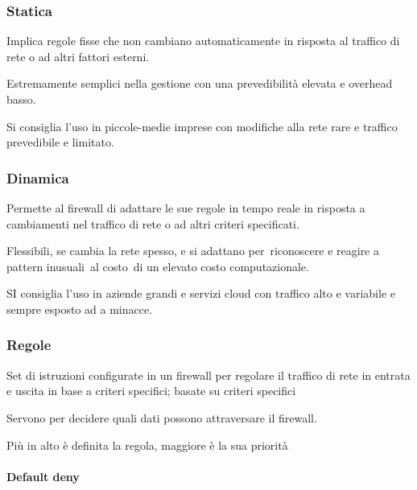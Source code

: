 \documentclass[
]{article}
\begin{document}
\subsubsection{\texorpdfstring{{Statica}}{Statica}}\label{h.iswr8y91qd0b}

{Implica regole fisse che non cambiano automaticamente in risposta al
traffico di rete o ad altri fattori esterni. }

{}

{Estremamente }{semplici nella gestione }{con una }{prevedibilità
elevata }{e }{overhead basso}{.}

{}

{Si consiglia l'uso in piccole-medie imprese con modifiche alla rete
rare e traffico prevedibile e limitato.}

\subsubsection{\texorpdfstring{{Dinamica}}{Dinamica}}\label{h.td2hx8kmr20g}

{Permette al firewall di adattare le sue regole in tempo reale in
risposta a cambiamenti nel traffico di rete o ad altri criteri
specificati.}

{}

{Flessibili}{, se cambia la rete spesso, e }{si adattano
per}{~riconoscere e reagire a }{pattern inusuali}{~al }{costo}{~di un
}{elevato }{costo computazionale.}

{}

{SI consiglia l'uso in aziende grandi e servizi cloud con traffico alto
e variabile e sempre esposto ad a minacce.}

\subsubsection{\texorpdfstring{{Regole}}{Regole}}\label{h.dnb399fesgk5}

{Set di istruzioni configurate in un firewall per regolare il traffico
di rete in entrata e uscita in base a criteri specifici; basate su
criteri specifici}

{}

{Servono per decidere quali dati possono attraversare il firewall.}

{}

{Più in alto è definita la regola, maggiore è la sua priorità}

\paragraph{\texorpdfstring{{Default
deny}}{Default deny}}\label{h.ilo7w9nrgmos}
\end{document}
